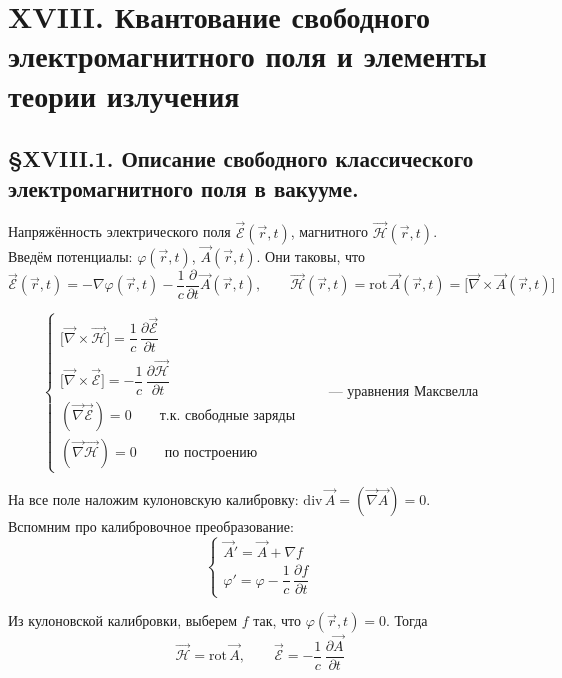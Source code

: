 \bigskip


\section{XVIII. Квантование свободного электромагнитного поля и элементы теории излучения}

\subsection{\S XVIII.1. Описание свободного классического электромагнитного поля в вакууме.}

Напряжённость электрического поля $\vec{\mathcal{E}}(\vec{r},t)$, магнитного $\vec{\mathcal{H}}(\vec{r},t)$.\\

Введём потенциалы: $\varphi(\vec{r},t)$, $\vec{A}(\vec{r},t)$. Они таковы, что
\[
\vec{\mathcal{E}}(\vec{r},t) = -\nabla\varphi(\vec{r},t) - \frac{1}{c}\frac{\partial}{\partial t}\vec{A}(\vec{r},t), \qquad
\vec{\mathcal{H}}(\vec{r},t) = \mathrm{rot}\,\vec{A}(\vec{r},t) = \bigl[\vec{\nabla}\times\vec{A}(\vec{r},t)\bigr]
\]

\[
\begin{cases}
	\bigl[\vec{\nabla}\times\vec{\mathcal{H}}\bigr] = \dfrac{1}{c}\,\dfrac{\partial\vec{\mathcal{E}}}{\partial t}\\[6pt]
	\bigl[\vec{\nabla}\times\vec{\mathcal{E}}\bigr] = -\dfrac{1}{c}\,\dfrac{\partial\vec{\mathcal{H}}}{\partial t}\\[6pt]
	(\vec{\nabla}\vec{\mathcal{E}}) = 0 \qquad \text{т.к. свободные заряды}\\[4pt]
	(\vec{\nabla}\vec{\mathcal{H}}) = 0 \qquad \text{по построению}
\end{cases}
\qquad\text{--- уравнения Максвелла}
\]

На все поле наложим кулоновскую калибровку: $\mathrm{div}\,\vec{A} = (\vec{\nabla}\vec{A}) = 0$.\\
Вспомним про калибровочное преобразование:
\[
\begin{cases}
	\vec{A}' = \vec{A} + \nabla f\\[4pt]
	\varphi' = \varphi - \dfrac{1}{c}\,\dfrac{\partial f}{\partial t}
\end{cases}
\]

Из кулоновской калибровки, выберем $f$ так, что $\varphi(\vec{r},t) = 0$. Тогда
\[
\vec{\mathcal{H}} = \mathrm{rot}\,\vec{A}, \qquad \vec{\mathcal{E}} = -\frac{1}{c}\,\frac{\partial\vec{A}}{\partial t}
\]

